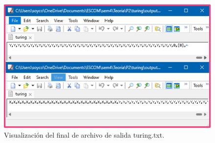 \begin{enumerate}
\begin{figure}[h]
    \begin{center}
    \includegraphics[width=1\linewidth]{Images/Cap7.png}
    \end{center}
\caption{Visualización del final de archivo de salida turing.txt.}
\label{fig:imagen}
\end{figure}
\end{enumerate}
